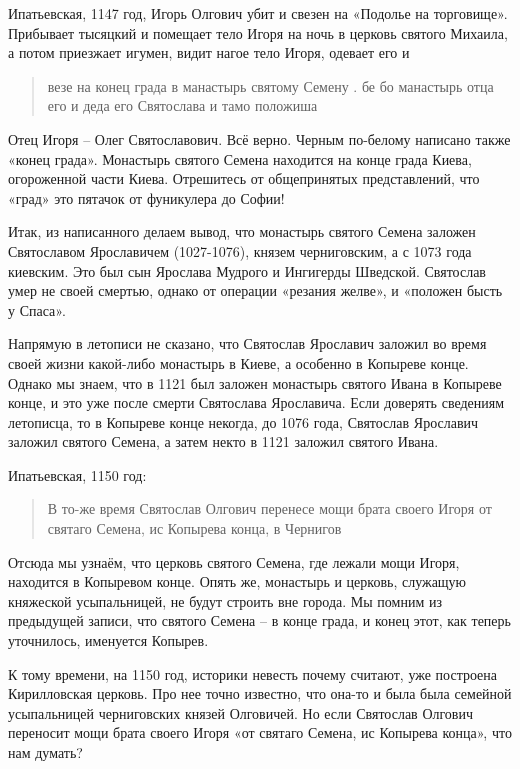 \documentclass[a5paper,11pt,openany]{article}
\begin{document}
Ипатьевская, 1147 год, Игорь Олгович убит и свезен на «Подолье на торговище». Прибывает тысяцкий и помещает тело Игоря на ночь в церковь святого Михаила, а потом приезжает игумен, видит нагое тело Игоря, одевает его и 

\begin{quotation}
\noindent везе на конец града в манастырь святому Семену . бе бо манастырь отца его и деда его Святослава и тамо положиша
\end{quotation}

Отец Игоря – Олег Святославович. Всё верно. Черным по-белому написано также «конец града». Монастырь святого Семена находится на конце града Киева, огороженной части Киева. Отрешитесь от общепринятых представлений, что «град» это пятачок от фуникулера до Софии!

Итак, из написанного делаем вывод, что монастырь святого Семена заложен Святославом Ярославичем (1027-1076), князем черниговским, а с 1073 года киевским. Это был сын Ярослава Мудрого и Ингигерды Шведской. Святослав умер не своей смертью, однако от операции «резания желве», и «положен бысть у Спаса».

Напрямую в летописи не сказано, что Святослав Ярославич заложил во время своей жизни какой-либо монастырь в Киеве, а особенно в Копыреве конце. Однако мы знаем, что в 1121 был заложен монастырь святого Ивана в Копыреве конце, и это уже после смерти Святослава Ярославича. Если доверять сведениям летописца, то в Копыреве конце некогда, до 1076 года, Святослав Ярославич заложил святого Семена, а затем некто в 1121 заложил святого Ивана.

Ипатьевская, 1150 год:

\begin{quotation}
\noindent В то-же время Святослав Олгович перенесе мощи брата своего Игоря от святаго Семена, ис Копырева конца, в Чернигов 
\end{quotation}

Отсюда мы узнаём, что церковь святого Семена, где лежали мощи Игоря, находится в Копыревом конце. Опять же, монастырь и церковь, служащую княжеской усыпальницей, не будут строить вне города. Мы помним из предыдущей записи, что святого Семена – в конце града, и конец этот, как теперь уточнилось, именуется Копырев.

К тому времени, на 1150 год, историки невесть почему считают, уже построена Кирилловская церковь. Про нее точно известно, что она-то и была была семейной усыпальницей черниговских князей Олговичей. Но если Святослав Олгович переносит мощи брата своего Игоря «от святаго Семена, ис Копырева конца», что нам думать?
\end{document}
